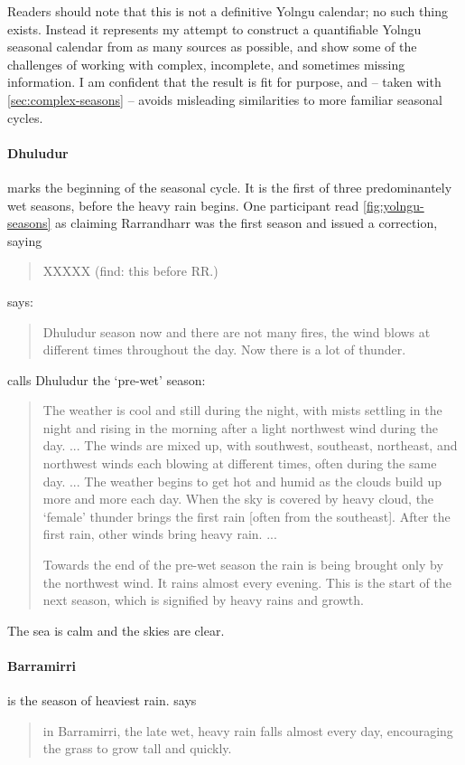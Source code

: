 Readers should note that this is not a definitive Yolngu calendar; no such
thing exists.  Instead it represents my attempt to construct a quantifiable
Yolngu seasonal calendar from as many sources as possible, and show some of
the challenges of working with complex, incomplete, and sometimes missing
information.  I am confident that the result is fit for purpose, and -- taken
with \cref{sec:complex-seasons} -- avoids misleading similarities to
more familiar seasonal cycles.



\paragraph{Dhuludur} marks the beginning of the seasonal cycle.  It is the
first of three predominantely wet seasons, before the heavy rain begins.
One participant read \cref{fig:yolngu-seasons} as claiming Rarrandharr
was the first season and issued a correction, saying \blockquote{
    XXXXX (find: this before RR.)}.

\citet[][p36]{atlas2014} says: \blockquote{
    Dhuludur season now and there are not many fires, the wind blows at
    different times throughout the day.  Now there is a lot of thunder.
}


\citet{davis1989} calls Dhuludur the `pre-wet' season: \blockquote{
    The weather is cool and still during the night, with mists settling in the night
    and rising in the morning after a light northwest wind during the day. ...
    The winds are mixed up, with southwest, southeast, northeast, and northwest winds
    each blowing at different times, often during the same day. ...
    The weather begins to get hot and humid as the clouds build up more and more each day.
    When the sky is covered by heavy cloud, the `female' thunder brings the first rain [often from the southeast].
    After the first rain, other winds bring heavy rain. ...

    Towards the end of the pre-wet season the rain is being brought only by the northwest wind.
    It rains almost every evening.
    This is the start of the next season, which is signified by heavy rains and growth.
}

The sea is calm and the skies are clear.


\paragraph{Barramirri} is the season of heaviest rain.
\citet[][p36]{atlas2014} says \blockquote{
    in Barramirri, the late wet, heavy rain falls almost every day,
    encouraging the grass to grow tall and quickly.
}

